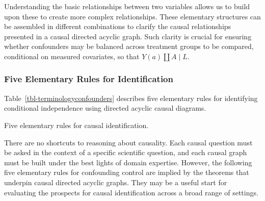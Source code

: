 \documentclass[
  single column]{article}
\begin{document}
Understanding the basic relationships between two variables allows us to
build upon these to create more complex relationships. These elementary
structures can be assembled in different combinations to clarify the
causal relationships presented in a causal directed acyclic graph. Such
clarity is crucial for ensuring whether confounders may be balanced
across treatment groups to be compared, conditional on measured
covariates, so that \(Y(a) \coprod A \mid L\).

\newpage{}

\subsubsection{Five Elementary Rules for
Identification}\label{five-elementary-rules-for-identification}

Table~\ref{tbl-terminologyconfounders} describes five elementary rules
for identifying conditional independence using directed acyclic causal
diagrams.

\begin{table}

\caption{\label{tbl-terminologyconfounders}Five elementary rules for
causal identification.}

\centering{

\terminologyelconfounders

}

\end{table}%

There are no shortcuts to reasoning about causality. Each causal
question must be asked in the context of a specific scientific question,
and each causal graph must be built under the best lights of domain
expertise. However, the following five elementary rules for confounding
control are implied by the theorems that underpin causal directed
acyclic graphs. They may be a useful start for evaluating the prospects
for causal identification across a broad range of settings.
\end{document}
